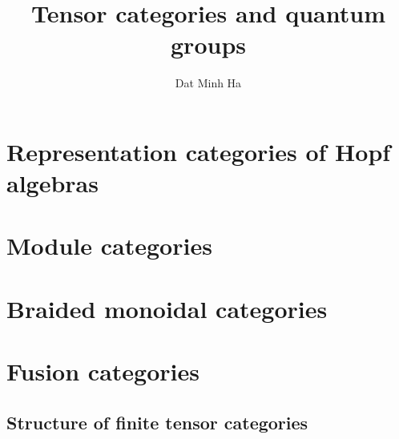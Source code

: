 

\setcounter{section}{-1}





	\title{Tensor categories and quantum groups}
	
	\author{Dat Minh Ha}
	\maketitle
	
	\begin{abstract}
	    
	\end{abstract}
	
	{
      \hypersetup{} 
      \tableofcontents %
    }
    
    \chapter{Representation categories of Hopf algebras}
    
    \chapter{Module categories}
    
    \chapter{Braided monoidal categories}
    
    \chapter{Fusion categories}
    
    \begin{appendices}
        \chapter{Structure of finite tensor categories}
    \end{appendices}
	
	\printbibliography

